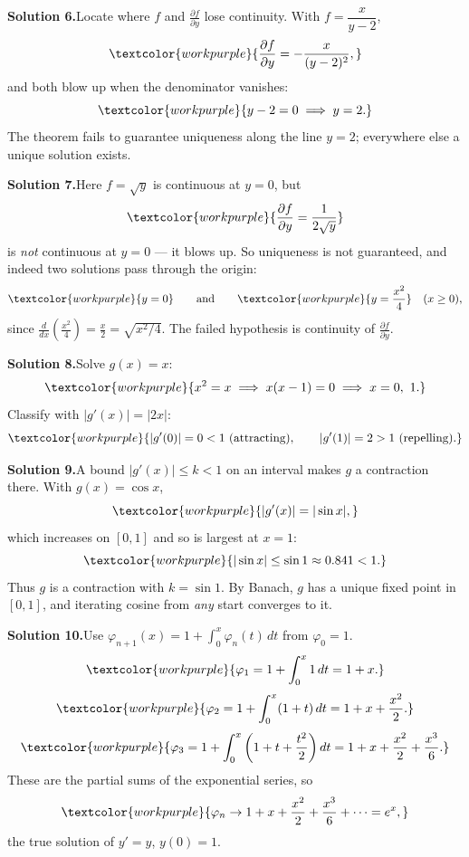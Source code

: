 \medskip
\noindent\textbf{Solution 6.}\quad Locate where $f$ and $\frac{\partial f}{\partial y}$
lose continuity. With $f = \dfrac{x}{y-2}$,
\[ \textcolor{workpurple}{\frac{\partial f}{\partial y} = -\frac{x}{(y-2)^2},} \]
and both blow up when the denominator vanishes:
\[ \textcolor{workpurple}{y - 2 = 0 \;\Longrightarrow\; y = 2.} \]
The theorem fails to guarantee uniqueness along the line $y = 2$; everywhere
else a unique solution exists.

\medskip
\noindent\textbf{Solution 7.}\quad Here $f = \sqrt{y}$ is continuous at $y=0$,
but
\[ \textcolor{workpurple}{\frac{\partial f}{\partial y} = \frac{1}{2\sqrt{y}}} \]
is \emph{not} continuous at $y = 0$ --- it blows up. So uniqueness is not
guaranteed, and indeed two solutions pass through the origin:
\[ \textcolor{workpurple}{y = 0} \qquad\text{and}\qquad
   \textcolor{workpurple}{y = \frac{x^{2}}{4}} \quad (x \ge 0), \]
since $\frac{d}{dx}\!\left(\frac{x^2}{4}\right) = \frac{x}{2} = \sqrt{x^2/4}$.
The failed hypothesis is continuity of $\frac{\partial f}{\partial y}$.

\medskip
\noindent\textbf{Solution 8.}\quad Solve $g(x) = x$:
\[ \textcolor{workpurple}{x^{2} = x \;\Longrightarrow\; x(x-1) = 0 \;\Longrightarrow\; x = 0,\ 1.} \]
Classify with $|g'(x)| = |2x|$:
\[ \textcolor{workpurple}{|g'(0)| = 0 < 1 \ (\text{attracting}), \qquad |g'(1)| = 2 > 1 \ (\text{repelling}).} \]

\medskip
\noindent\textbf{Solution 9.}\quad A bound $|g'(x)| \le k < 1$ on an interval
makes $g$ a contraction there. With $g(x) = \cos x$,
\[ \textcolor{workpurple}{|g'(x)| = |\sin x|,} \]
which increases on $[0,1]$ and so is largest at $x = 1$:
\[ \textcolor{workpurple}{|\sin x| \le \sin 1 \approx 0.841 < 1.} \]
Thus $g$ is a contraction with $k = \sin 1$. By Banach, $g$ has a
\textcolor{workpurple}{unique} fixed point in $[0,1]$, and iterating cosine from
\emph{any} start converges to it.

\medskip
\noindent\textbf{Solution 10.}\quad Use $\varphi_{n+1}(x) = 1 + \int_0^x \varphi_n(t)\,dt$
from $\varphi_0 = 1$.
\[ \textcolor{workpurple}{\varphi_1 = 1 + \int_0^x 1\,dt = 1 + x.} \]
\[ \textcolor{workpurple}{\varphi_2 = 1 + \int_0^x (1+t)\,dt = 1 + x + \frac{x^2}{2}.} \]
\[ \textcolor{workpurple}{\varphi_3 = 1 + \int_0^x \left(1 + t + \frac{t^2}{2}\right)dt = 1 + x + \frac{x^2}{2} + \frac{x^3}{6}.} \]
These are the partial sums of the exponential series, so
\[ \textcolor{workpurple}{\varphi_n \to 1 + x + \frac{x^2}{2} + \frac{x^3}{6} + \cdots = e^{x},} \]
the true solution of $y' = y$, $y(0) = 1$.

